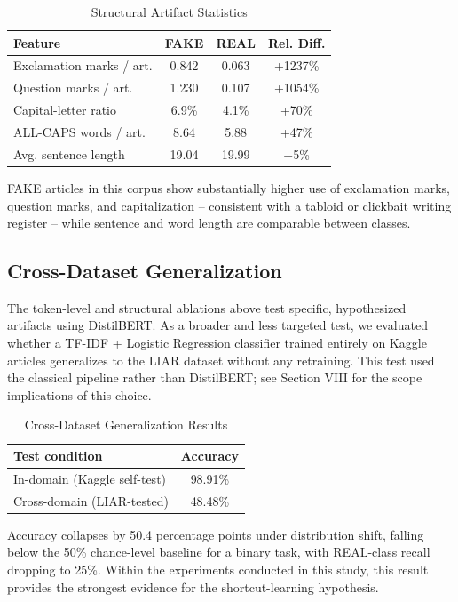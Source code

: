\documentclass[conference]{IEEEtran}
\begin{document}
\begin{table}[!t]
\caption{Structural Artifact Statistics}
\centering
\begin{tabular}{lccc}
\toprule
Feature & FAKE & REAL & Rel. Diff. \\
\midrule
Exclamation marks / art. & 0.842 & 0.063 & +1237\% \\
Question marks / art. & 1.230 & 0.107 & +1054\% \\
Capital-letter ratio & 6.9\% & 4.1\% & +70\% \\
ALL-CAPS words / art. & 8.64 & 5.88 & +47\% \\
Avg. sentence length & 19.04 & 19.99 & $-$5\% \\
\bottomrule
\end{tabular}
\end{table}

FAKE articles in this corpus show substantially higher use of exclamation marks, question marks, and capitalization -- consistent with a tabloid or clickbait writing register -- while sentence and word length are comparable between classes.

\subsection{Cross-Dataset Generalization}
The token-level and structural ablations above test specific, hypothesized artifacts using DistilBERT. As a broader and less targeted test, we evaluated whether a TF-IDF + Logistic Regression classifier trained entirely on Kaggle articles generalizes to the LIAR dataset without any retraining. This test used the classical pipeline rather than DistilBERT; see Section VIII for the scope implications of this choice.

\begin{table}[!t]
\caption{Cross-Dataset Generalization Results}
\centering
\begin{tabular}{lc}
\toprule
Test condition & Accuracy \\
\midrule
In-domain (Kaggle self-test) & 98.91\% \\
Cross-domain (LIAR-tested) & 48.48\% \\
\bottomrule
\end{tabular}
\end{table}

Accuracy collapses by 50.4 percentage points under distribution shift, falling below the 50\% chance-level baseline for a binary task, with REAL-class recall dropping to 25\%. Within the experiments conducted in this study, this result provides the strongest evidence for the shortcut-learning hypothesis.
\end{document}
